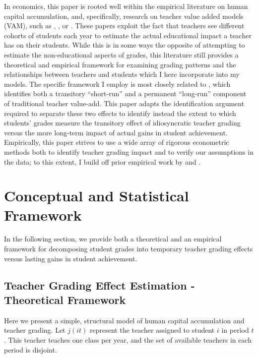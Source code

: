 \documentclass{article}\usepackage{knitr}
\begin{document}
In economics, this paper is rooted well within the empirical literature on human capital accumulation, and, specifically, research on teacher value added models (VAM), such as \citet{chettyMeasuringImpactsTeachers2014}, \citet{kaneEstimatingTeacherImpacts2008}, or \citet{jacksonTeacherEffectsTeacherRelated2014}. These papers exploit the fact that teachers see different cohorts of students each year to estimate the actual educational impact a teacher has on their students. While this is in some ways the opposite of attempting to estimate the non-educational aspects of grades, this literature still provides a theoretical and empirical framework for examining grading patterns and the relationships between teachers and students which I here incorporate into my models. The specific framework I employ is most closely related to \citet{gilraineMakingTeachingLast2020}, which identifies both a transitory ``short-run'' and a permanent ``long-run'' component of traditional teacher value-add. This paper adapts the identification argument required to separate these two effects to identify instead the extent to which students' grades measure the transitory effect of idiosyncratic teacher grading versus the more long-term impact of actual gains in student achievement. Empirically, this paper strives to use a wide array of rigorous econometric methods both to identify teacher grading impact and to verify our assumptions in the data; to this extent, I  build off prior empirical work by \citet{abdulkadirogluChartersLotteriesTesting2016} and \citet{kolesarIdentificationInferenceMany2015}.





\doublespacing
\section{Conceptual and Statistical Framework}
\label{section:framework}

In the following section, we provide both a theoretical and an empirical framework for decomposing student grades into temporary teacher grading effects versus lasting gains in student achievement. 

\subsection{Teacher Grading Effect Estimation - Theoretical Framework}

Here we present a simple, structural model of human capital accumulation and teacher grading. Let $j(it)$ represent the teacher assigned to student $i$ in period $t$. This teacher teaches one class per year, and the set of available teachers in each period is disjoint.
\end{document}
